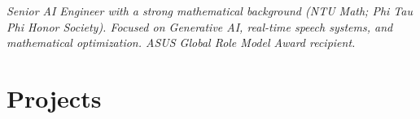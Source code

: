 



\begin{center}

    \small \textit{Senior AI Engineer with a strong mathematical background (NTU Math; Phi Tau Phi Honor Society). Focused on Generative AI, real-time speech systems, and mathematical optimization. ASUS Global Role Model Award recipient.}
\end{center}


\resumeItemListStart




\resumeItemListEnd
\resumeSubHeadingListEnd



\section{Projects}
    \resumeSubHeadingListStart


    \resumeSubHeadingListEnd




